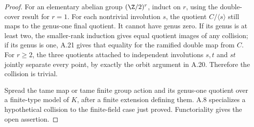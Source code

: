 \begin{proof}
For an elementary abelian group $(\Z/2)^r$, induct on
$r$, using the double-cover result for $r=1$. For each
nontrivial involution $s$, the quotient $C/\langle s\rangle$
still maps to the genus-one final quotient. It cannot have
genus zero. If its genus is at least two, the smaller-rank
induction gives equal quotient images of any collision;
if its genus is one, A.21 gives that equality for the
ramified double map from $C$. For $r\ge2$, the three
quotients attached to independent involutions $s,t$ and
$st$ jointly separate every point, by exactly the orbit
argument in A.20. Therefore the collision is trivial.

Spread the tame map or tame finite group action and its
genus-one quotient over a finite-type model of $K$, after
a finite extension defining them. A.8 specializes a
hypothetical collision to the finite-field case just
proved. Functoriality gives the open assertion.
\end{proof}






